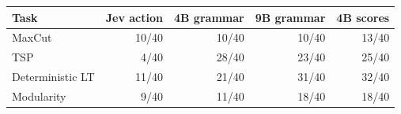 \begin{tabular}{lrrrr}
\toprule
Task & Jev action & 4B grammar & 9B grammar & 4B scores \\
\midrule
MaxCut & 10/40 & 10/40 & 10/40 & 13/40 \\
TSP & 4/40 & 28/40 & 23/40 & 25/40 \\
Deterministic LT & 11/40 & 21/40 & 31/40 & 32/40 \\
Modularity & 9/40 & 11/40 & 18/40 & 18/40 \\
\bottomrule
\end{tabular}
